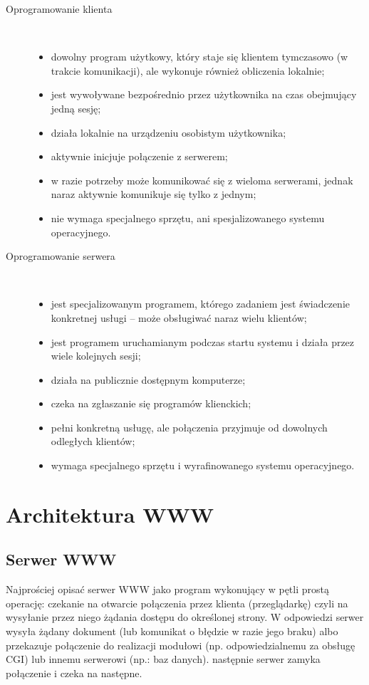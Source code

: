 \begin{description}
\item[Oprogramowanie klienta]\
\begin{itemize}
\item dowolny program użytkowy, który staje się klientem tymczasowo (w trakcie komunikacji), ale wykonuje również obliczenia
lokalnie;
\item jest wywoływane bezpośrednio przez użytkownika na czas obejmujący jedną sesję;
\item działa lokalnie na urządzeniu osobistym użytkownika;
\item aktywnie inicjuje połączenie z serwerem;
\item w razie potrzeby może komunikować się z wieloma serwerami, jednak naraz aktywnie komunikuje się tylko z jednym;
\item nie wymaga specjalnego sprzętu, ani spesjalizowanego systemu operacyjnego.
\end{itemize}
\item[Oprogramowanie serwera]\
\begin{itemize}
\item jest specjalizowanym programem, którego zadaniem jest świadczenie konkretnej usługi -- może obsługiwać naraz wielu
klientów;
\item jest programem uruchamianym podczas startu systemu i działa przez wiele kolejnych sesji;
\item działa na publicznie dostępnym komputerze;
\item czeka na zgłaszanie się programów klienckich;
\item pełni konkretną usługę, ale połączenia przyjmuje od dowolnych odległych klientów;
\item wymaga specjalnego sprzętu i wyrafinowanego systemu operacyjnego.
\end{itemize}
\end{description}

\section{Architektura WWW}

\subsection{Serwer WWW}

\hspace{0.63cm}Najprościej opisać serwer WWW jako program wykonujący w pętli prostą operację: czekanie na otwarcie połączenia przez klienta
(przeglądarkę) czyli na wysyłanie przez niego żądania dostępu do określonej strony. W odpowiedzi serwer wysyła żądany dokument 
(lub komunikat o błędzie w razie jego braku) albo przekazuje połączenie do realizacji modułowi (np. odpowiedzialnemu za obsługę
CGI) lub innemu serwerowi (np.: baz danych). następnie serwer zamyka połączenie i czeka na następne. 

